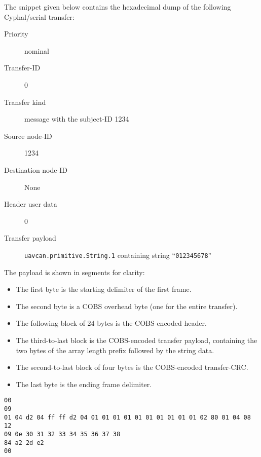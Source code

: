 %
%
\begin{remark}
    The snippet given below contains the hexadecimal dump of the following Cyphal/serial transfer:

    \begin{description}
        \item[Priority] nominal
        \item[Transfer-ID] 0
        \item[Transfer kind] message with the subject-ID 1234
        \item[Source node-ID] 1234
        \item[Destination node-ID] None
        \item[Header user data] 0
        \item[Transfer payload] \verb|uavcan.primitive.String.1| containing string ``\verb|012345678|''
    \end{description}

    The payload is shown in segments for clarity:

    \begin{itemize}
        \item The first byte is the starting delimiter of the first frame.
        \item The second byte is a COBS overhead byte (one for the entire transfer).
        \item The following block of 24 bytes is the COBS-encoded header.
        \item The third-to-last block is the COBS-encoded transfer payload,
        containing the two bytes of the array length prefix followed by the string data.
        \item The second-to-last block of four bytes is the COBS-encoded transfer-CRC.
        \item The last byte is the ending frame delimiter.
    \end{itemize}

    \begin{verbatim}
00
09
01 04 d2 04 ff ff d2 04 01 01 01 01 01 01 01 01 01 01 02 80 01 04 08 12
09 0e 30 31 32 33 34 35 36 37 38
84 a2 2d e2
00
    \end{verbatim}
\end{remark}

